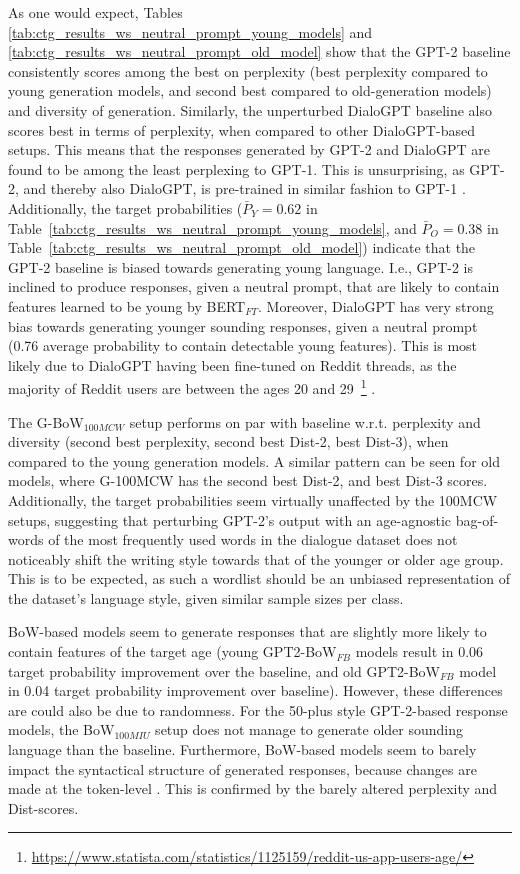 As one would expect, Tables \ref{tab:ctg_results_ws_neutral_prompt_young_models} and \ref{tab:ctg_results_ws_neutral_prompt_old_model} show that the GPT-2 baseline consistently scores among the best on perplexity (best perplexity compared to young generation models, and second best compared to old-generation models) and diversity of generation. Similarly, the unperturbed DialoGPT baseline also scores best in terms of perplexity, when compared to other DialoGPT-based setups. This means that the responses generated by GPT-2 and DialoGPT are found to be among the least perplexing to GPT-1. This is unsurprising, as GPT-2, and thereby also DialoGPT, is pre-trained in similar fashion to GPT-1 \citep{radford2018improving, radford2019language, zhang2019dialogpt}. Additionally, the target probabilities ($\bar{P}_Y = 0.62$ in Table~\ref{tab:ctg_results_ws_neutral_prompt_young_models}, and $\bar{P}_O = 0.38$ in Table~\ref{tab:ctg_results_ws_neutral_prompt_old_model}) indicate that the GPT-2 baseline is biased towards generating young language. I.e., GPT-2 is inclined to produce responses, given a neutral prompt, that are likely to contain features learned to be young by BERT$_{FT}$. Moreover, DialoGPT has very strong bias towards generating younger sounding responses, given a neutral prompt (0.76 average probability to contain detectable young features). This is most likely due to DialoGPT having been fine-tuned on Reddit threads, as the majority of Reddit users are between the ages 20 and 29~\footnote{\url{https://www.statista.com/statistics/1125159/reddit-us-app-users-age/}}
\citep{zhang2019dialogpt}.

The G-BoW$_{100MCW}$ setup performs on par with baseline w.r.t. perplexity and diversity (second best perplexity, second best Dist-2, best Dist-3), when compared to the young generation models. A similar pattern can be seen for old models, where G-100MCW has the second best Dist-2, and best Dist-3 scores. Additionally, the target probabilities seem virtually unaffected by the 100MCW setups, suggesting that perturbing GPT-2's output with an age-agnostic bag-of-words of the most frequently used words in the dialogue dataset does not noticeably shift the writing style towards that of the younger or older age group. This is to be expected, as such a wordlist should be an unbiased representation of the dataset's language style, given similar sample sizes per class.

BoW-based models seem to generate responses that are slightly more likely to contain features of the target age (young GPT2-BoW$_{FB}$ models result in 0.06 target probability improvement over the baseline, and old GPT2-BoW$_{FB}$ model in 0.04 target probability improvement over baseline). However, these differences are could also be due to randomness. For the 50-plus style GPT-2-based response models, the BoW$_{100MIU}$ setup does not manage to generate older sounding language than the baseline. Furthermore, BoW-based models seem to barely impact the syntactical structure of generated responses, because changes are made at the token-level \cite{dathathri2019plug}. This is confirmed by the barely altered perplexity and Dist-scores.  

